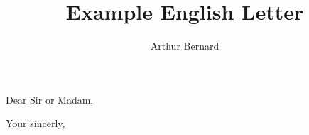 \documentclass[a4paper]{arthur-letter}
\title{Example English Letter}
\author{Arthur Bernard}
\begin{document}
    \makeprofile %
    
    \address{John ,\\123, somestreet\\Somecity}

    \begin{letter}

            \subject{Subject of my letter}

            \opening{Dear Sir or Madam,}

            \lipsum[1-3]

            \closing{Your sincerly,} %


    \end{letter}
\end{document}
